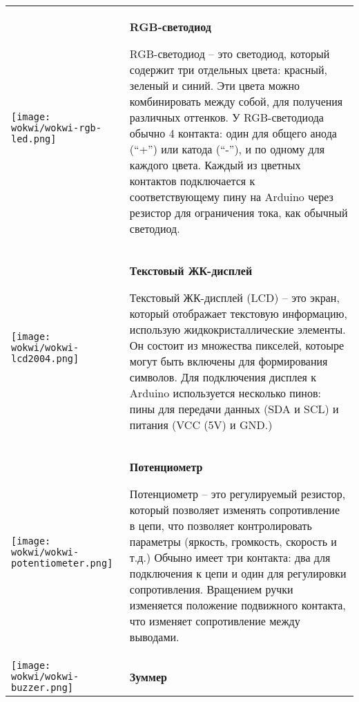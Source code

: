 \documentclass[../sparc.tex]{subfiles}
\begin{document}
\begin{longtable}{|>{
      \centering\arraybackslash
    }p{3cm}|>{
      \centering\arraybackslash}p{8cm}|
  }
{} \\  \hline

\parbox[t][3,6cm][c]{2cm}{\centering \vspace{1cm}
  \texttt{[image: wokwi/wokwi-rgb-led.png]}} &
\parbox[t][5.1cm][t]{8cm}{\centering \textbf{RGB-светодиод}\\ \raggedright

RGB-светодиод -- это светодиод, который содержит три отдельных цвета: красный,
зеленый и синий.  Эти цвета можно комбинировать между собой, для получения
различных оттенков.  У RGB-светодиода обычно 4 контакта: один для общего анода
(``+'') или катода (``-''), и по одному для каждого цвета.  Каждый из цветных
контактов подключается к соответствующему пину на Arduino через резистор для
ограничения тока, как обычный светодиод.

} \\  \hline

\parbox[t][2,8cm][c]{2cm}{\centering \vspace{1cm}
  \texttt{[image: wokwi/wokwi-lcd2004.png]}} &
\parbox[t][4.3cm][t]{8cm}{\centering \textbf{Текстовый ЖК-дисплей}\\ \raggedright

Текстовый ЖК-дисплей (LCD) -- это экран, который отображает текстовую информацию,
использую жидкокристаллические элементы.  Он состоит из множества пикселей,
котоыре могут быть включены для формирования символов.  Для подключения дисплея
к Arduino используется несколько пинов: пины для передачи данных (SDA и SCL) и
питания (VCC (5V) и GND.)

} \\  \hline

\parbox[t][2,5cm][c]{2cm}{\centering \vspace{1cm}
  \texttt{[image: wokwi/wokwi-potentiometer.png]}} &
\parbox[t][4.3cm][t]{8cm}{\centering \textbf{Потенциометр}\\ \raggedright

Потенциометр -- это регулируемый резистор, который позволяет изменять
сопротивление в цепи, что позволяет контролировать параметры (яркость,
громкость, скорость и т.д.)  Обчыно имеет три контакта: два для подключения к
цепи и один для регулировки сопротивления.  Вращением ручки изменяется положение
подвижного контакта, что изменяет сопротивление между выводами.

} \\  \hline

\parbox[t][1,8cm][c]{2cm}{\centering \vspace{1cm}
  \texttt{[image: wokwi/wokwi-buzzer.png]}} &
\parbox[t][3.6cm][t]{8cm}{\centering \textbf{Зуммер}\\ \raggedright

}
\end{longtable}
\end{document}
